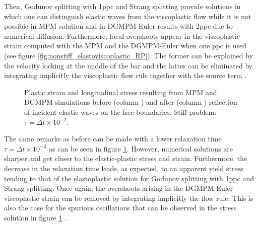 Then, Godunov splitting with 1ppc and Strang splitting provide solutions in which one can distinguish elastic waves from the viscoplastic flow while it is not possible in MPM solution and in DGMPM-Euler results with 2ppc due to numerical diffusion.
Furthermore, local overshoots appear in the viscoplastic strain computed with the MPM and the DGMPM-Euler when one ppc is used (see figure \ref{fig:nonstiff_elastoviscoplastic_RP}). 
The former can be explained by the velocity locking at the middle of the bar and the latter can be eliminated by integrating implicitly the viscoplastic flow rule together with the source term \cite{Thomas_EVP}.
\begin{figure}[h!]
  \centering
  { \label{subfig:evp_stiff1}}
  { \label{subfig:evp_stiff3}}
  {}
  \caption{Plastic strain and longitudinal stress resulting from MPM and DGMPM simulations before (column ) and after (column ) reflection of incident elastic waves on the free boundaries. Stiff problem: $\tau=\Delta t \times 10^{-2}$.}
  \label{fig:siff_elastoviscoplastic_RP}
\end{figure}

The same remarks as before can be made with a lower relaxation time $\tau=\Delta t \times 10^{-2}$ as can be seen in figure \ref{fig:siff_elastoviscoplastic_RP}. However, numerical solutions are sharper and get closer to the elastic-plastic stress and strain.
Furthermore, the decrease in the relaxation time leads, as expected, to an apparent yield stress tending to that of the elastoplastic solution for Godunov splitting with 1ppc and Strang splitting.
Once again, the overshoots arising in the DGMPM-Euler viscoplastic strain can be removed by integrating implicitly the flow rule. This is also the case for the spurious oscillations that can be observed in the stress solution in figure \ref{fig:siff_elastoviscoplastic_RP} \cite{Thomas_EVP}. 

